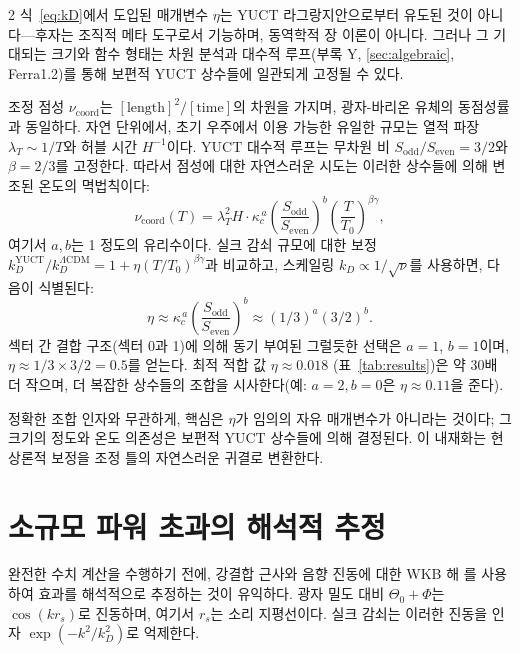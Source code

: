 \documentclass[11pt,a4paper]{article}
\begin{document}
\begin{multicols}{2}
		식~\eqref{eq:kD}에서 도입된 매개변수 $\eta$는 YUCT 라그랑지안으로부터 유도된 것이 아니다—후자는 조직적 메타 도구로서 기능하며, 동역학적 장 이론이 아니다. 그러나 그 기대되는 크기와 함수 형태는 차원 분석과 대수적 루프(부록 Y, \ref{sec:algebraic}, Ferra1.2)를 통해 보편적 YUCT 상수들에 일관되게 고정될 수 있다.
		
		조정 점성 $\nu_{\mathrm{coord}}$는 $[\mathrm{length}]^2/[\mathrm{time}]$의 차원을 가지며, 광자-바리온 유체의 동점성률과 동일하다. 자연 단위에서, 초기 우주에서 이용 가능한 유일한 규모는 열적 파장 $\lambda_T \sim 1/T$와 허블 시간 $H^{-1}$이다. YUCT 대수적 루프는 무차원 비 $S_{\mathrm{odd}}/S_{\mathrm{even}} = 3/2$와 $\beta = 2/3$를 고정한다. 따라서 점성에 대한 자연스러운 시도는 이러한 상수들에 의해 변조된 온도의 멱법칙이다:
		\begin{equation}
			\nu_{\mathrm{coord}}(T) = \lambda_T^2 H \cdot \kappa_c^{\,a} \left(\frac{S_{\mathrm{odd}}}{S_{\mathrm{even}}}\right)^b \left(\frac{T}{T_0}\right)^{\beta\gamma},
		\end{equation}
		여기서 $a,b$는 1 정도의 유리수이다. 실크 감쇠 규모에 대한 보정 $k_D^{\mathrm{YUCT}}/k_D^{\Lambda\mathrm{CDM}} = 1 + \eta (T/T_0)^{\beta\gamma}$과 비교하고, 스케일링 $k_D \propto 1/\sqrt{\nu}$를 사용하면, 다음이 식별된다:
		\begin{equation}
			\eta \approx \kappa_c^{\,a} \left(\frac{S_{\mathrm{odd}}}{S_{\mathrm{even}}}\right)^b \approx (1/3)^a (3/2)^b.
		\end{equation}
		섹터 간 결합 구조(섹터 0과 1)에 의해 동기 부여된 그럴듯한 선택은 $a=1$, $b=1$이며, $\eta \approx 1/3 \times 3/2 = 0.5$를 얻는다. 최적 적합 값 $\eta \approx 0.018$ (표~\ref{tab:results})은 약 30배 더 작으며, 더 복잡한 상수들의 조합을 시사한다(예: $a=2, b=0$은 $\eta \approx 0.11$을 준다).
		
		정확한 조합 인자와 무관하게, 핵심은 $\eta$가 임의의 자유 매개변수가 아니라는 것이다; 그 크기의 정도와 온도 의존성은 보편적 YUCT 상수들에 의해 결정된다. 이 내재화는 현상론적 보정을 조정 틀의 자연스러운 귀결로 변환한다.
		
		\section{소규모 파워 초과의 해석적 추정}
		
		완전한 수치 계산을 수행하기 전에, 강결합 근사와 음향 진동에 대한 WKB 해 \cite{Hu1995}를 사용하여 효과를 해석적으로 추정하는 것이 유익하다. 광자 밀도 대비 $\Theta_0 + \Phi$는 $\cos(k r_s)$로 진동하며, 여기서 $r_s$는 소리 지평선이다. 실크 감쇠는 이러한 진동을 인자 $\exp(-k^2/k_D^2)$로 억제한다.
		

\end{multicols}
\end{document}
